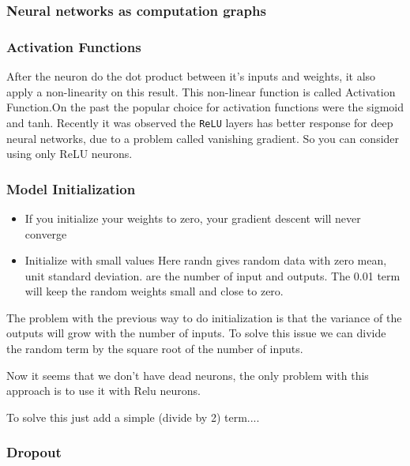 \documentclass[11pt]{article}
\begin{document}
\subsubsection{Neural networks as computation
graphs}\label{neural-networks-as-computation-graphs}

 

    \subsubsection{Activation Functions}\label{activation-functions}

 After the neuron do the dot product between it's inputs and weights, it
also apply a non-linearity on this result. This non-linear function is
called Activation Function.On the past the popular choice for activation
functions were the sigmoid and tanh. Recently it was observed the
\texttt{ReLU} layers has better response for deep neural networks, due
to a problem called vanishing gradient. So you can consider using only
ReLU neurons. 

    \subsubsection{Model Initialization}\label{model-initialization}

\begin{itemize}
\item
  If you initialize your weights to zero, your gradient descent will
  never converge 
\item
  Initialize with small values Here randn gives random data with zero
  mean, unit standard deviation. are the number of input and outputs.
  The 0.01 term will keep the random weights small and close to zero. 
\end{itemize}

The problem with the previous way to do initialization is that the
variance of the outputs will grow with the number of inputs. To solve
this issue we can divide the random term by the square root of the
number of inputs.

Now it seems that we don't have dead neurons, the only problem with this
approach is to use it with Relu neurons.

To solve this just add a simple (divide by 2) term.... 

    \subsubsection{Dropout}\label{dropout}
\end{document}
